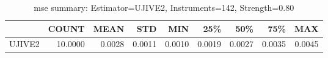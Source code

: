 \begin{table}[ht]
\centering
\caption{mse summary: Estimator=UJIVE2, Instruments=142, Strength=0.80}
\begin{tabular}{lrrrrrrrr}
\toprule
 & COUNT & MEAN & STD & MIN & 25\% & 50\% & 75\% & MAX \\
\midrule
UJIVE2 & 10.0000 & 0.0028 & 0.0011 & 0.0010 & 0.0019 & 0.0027 & 0.0035 & 0.0045 \\
\bottomrule
\end{tabular}
\end{table}
